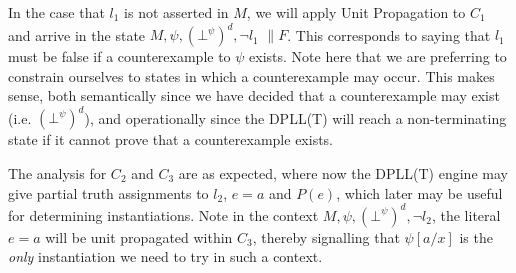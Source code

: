 \documentclass{llncs}
\begin{document}
In the case that $l_1$ is not asserted in $M$, we will apply Unit Propagation to $C_1$ and arrive in the state $M, \psi, ( \bot^\psi )^d, \neg l_1$ $\parallel F$.
This corresponds to saying that $l_1$ must be false if a counterexample to $\psi$ exists.
Note here that we are preferring to constrain ourselves to states in which a counterexample may occur.
This makes sense, both semantically since we have decided that a counterexample may exist (i.e. $( \bot^\psi )^d$), and operationally since the DPLL(T) will reach a non-terminating state if it cannot prove that a counterexample exists.




The analysis for $C_2$ and $C_3$ are as expected, where now the DPLL(T) engine may give partial truth assignments to $l_2$, $e = a$ and $P( e )$, which later may be useful for determining instantiations.
Note in the context $M, \psi, ( \bot^\psi )^d, \neg l_2$, the literal $e = a$ will be unit propagated within $C_3$, thereby signalling that $\psi[a/x]$ is the \emph{only} instantiation we need to try in such a context.
\end{document}
